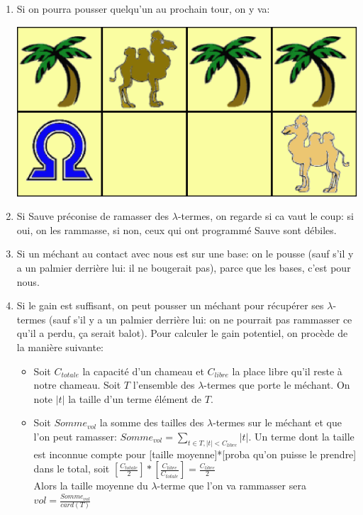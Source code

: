 \documentclass[a4paper,12pt]{article}
\begin{document}
\begin{enumerate}
\begin{center}
\end{center}
\item Si on pourra pousser quelqu'un au prochain tour, on y va:
\begin{center}
\includegraphics[scale=0.3]{./graph004.eps}
\end{center}
\item Si Sauve pr\'econise de ramasser des $\lambda$-termes, on regarde si ca vaut le coup: si oui, on les rammasse, si non, ceux qui ont programm\'e Sauve sont d\'ebiles.
\item Si un m\'echant au contact avec nous est sur une base: on le pousse (sauf s'il y a un palmier derri\`ere lui: il ne bougerait pas), parce que les bases, c'est pour nous.
\item Si le gain est suffisant, on peut pousser un m\'echant pour r\'ecup\'erer ses $\lambda$-termes (sauf s'il y a un palmier derri\`ere lui: on ne pourrait pas rammasser ce qu'il a perdu, \c ca serait balot). Pour calculer le gain potentiel, on proc\`ede de la mani\`ere suivante:
\begin{itemize}
\item Soit $C_{totale}$ la capacit\'e d'un chameau et $C_{libre}$ la place libre qu'il reste \`a notre chameau. Soit $T$ l'ensemble des $\lambda$-termes que porte le m\'echant. On note $|t|$ la taille d'un terme \'el\'ement de $T$.
\item Soit $Somme_{vol}$ la somme des tailles des $\lambda$-termes sur le m\'echant et que l'on peut ramasser: $Somme_{vol}=\displaystyle{\sum_{t\in T, |t|<C_{libre}}{|t|}}$. Un terme dont la taille est inconnue compte pour [taille moyenne]*[proba qu'on puisse le prendre] dans le total, soit $\displaystyle{[\frac{C_{totale}}{2}]*[\frac{C_{libre}}{C_{totale}}]=\frac{C_{libre}}{2}}$\\
Alors la taille moyenne du $\lambda$-terme que l'on va rammasser sera $vol=\displaystyle{\frac{Somme_{vol}}{card(T)}}$

\end{itemize}
\end{enumerate}
\end{document}

